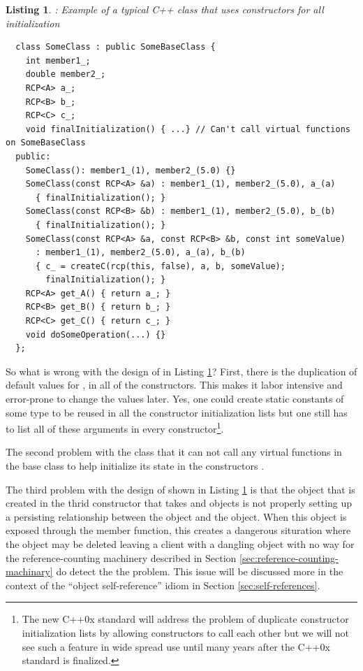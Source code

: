 \documentclass[pdf,ps2pdf,11pt]{SANDreport}
\newtheorem{listing}{Listing}
\begin{document}
\begin{listing}: Example of a typical C++ class that uses constructors for all
initialization  \\
\label{listing:sci:SomeClass-before}
{\small\begin{verbatim}
  class SomeClass : public SomeBaseClass {
    int member1_;
    double member2_;
    RCP<A> a_;
    RCP<B> b_;
    RCP<C> c_;
    void finalInitialization() { ...} // Can't call virtual functions on SomeBaseClass
  public:
    SomeClass(): member1_(1), member2_(5.0) {}
    SomeClass(const RCP<A> &a) : member1_(1), member2_(5.0), a_(a)
      { finalInitialization(); }
    SomeClass(const RCP<B> &b) : member1_(1), member2_(5.0), b_(b)
      { finalInitialization(); }
    SomeClass(const RCP<A> &a, const RCP<B> &b, const int someValue)
      : member1_(1), member2_(5.0), a_(a), b_(b)
      { c_ = createC(rcp(this, false), a, b, someValue);
        finalInitialization(); }
    RCP<A> get_A() { return a_; }
    RCP<B> get_B() { return b_; }
    RCP<C> get_C() { return c_; }
    void doSomeOperation(...) {}
  };

\end{verbatim}}
\end{listing}


So what is wrong with the design of {} in Listing
{}\ref{listing:sci:SomeClass-before}?  First, there is the duplication of
default values for {}, {} in all of the
constructors.  This makes it labor intensive and error-prone to change the
values later.  Yes, one could create static constants of some type to be
reused in all the constructor initialization lists but one still has to list
all of these arguments in every constructor\footnote{The new C++0x standard
will address the problem of duplicate constructor initialization lists by
allowing constructors to call each other but we will not see such a feature in
wide spread use until many years after the C++0x standard is finalized.}.

The second problem with the class {} that it can not
call any virtual functions in the base class {} to
help initialize its state in the constructors {}\cite[Item
49]{C++CodingStandards05}.

The third problem with the design of {} shown in Listing
{}\ref{listing:sci:SomeClass-before} is that the {} object that is
created in the thrid constructor that takes {} and {} objects is
not properly setting up a persisting relationship between the {} object
and the {} object.  When this {} object is exposed
through the {} member function, this creates a dangerous
situration where the {} object may be deleted leaving a client
with a dangling {} object with no way for the reference-counting
machinery described in Section {}\ref{sec:reference-counting-machinary} do
detect the the problem.  This issue will be discussed more in the context of
the ``object self-reference'' idiom in Section {}\ref{sec:self-references}.
\end{document}
